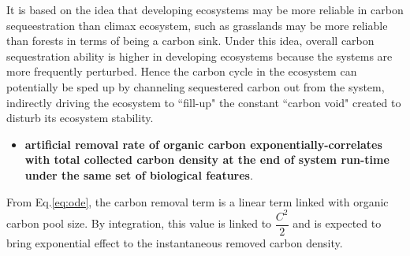 \documentclass[../thesis.tex]{subfiles} %
\begin{document}
It is based on the idea that developing ecosystems may be more reliable in carbon sequeestration than climax ecosystem, such as grasslands may be more reliable than forests in terms of being a carbon sink.\autocite{dass2018grasslands}  Under this idea, overall carbon sequestration ability is higher in developing ecosystems because the systems are more frequently perturbed.  Hence the carbon cycle in the ecosystem can potentially be sped up by channeling sequestered carbon out from the system, indirectly driving the ecosystem to ``fill-up" the constant ``carbon void" created to disturb its ecosystem stability.

\begin{itemize}
    \item \textbf{artificial removal rate of organic carbon exponentially-correlates with total collected carbon density at the end of system run-time under the same set of biological features}.
\end{itemize} %

From Eq.\ref{eq:ode}, the carbon removal term is a linear term linked with organic carbon pool size. By integration, this value is linked to $\dfrac{C^2}{2}$ and is expected to bring exponential effect to the instantaneous removed carbon density.
\end{document}

